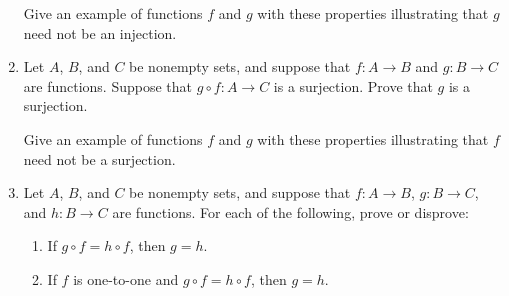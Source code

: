 \documentclass[12pt]{article}
\begin{document}
\begin{enumerate}
  Give an example of functions $f$ and $g$ with these properties illustrating that $g$ need not be an injection.


\item Let $A$, $B$, and $C$ be nonempty sets, and suppose that  $f\colon A\to B$ and $g\colon B\to C$ are functions.
  Suppose that $g\circ f\colon A\to C$ is a surjection.
  Prove that $g$ is a surjection.

  Give an example of functions $f$ and $g$ with these properties illustrating that $f$ need not be a surjection.



\item Let $A$, $B$, and $C$ be nonempty sets, and suppose that  $f\colon A\to B$, $g\colon B\to C$, and $h\colon B\to C$ are functions.
  For each of the following, prove or disprove:
  
 \begin{enumerate}
  \item  If $g\circ f= h\circ f$, then $g=h$.
  \item  If $f$ is one-to-one and $g\circ f= h\circ f$, then $g=h$.
 \end{enumerate}  


\end{enumerate}
\end{document}
